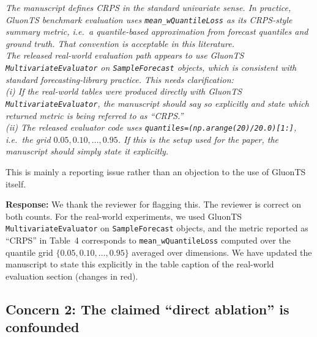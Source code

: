 \documentclass[11pt]{article}
\newcommand{\reviewertext}[1]{%
  \begin{reviewerquote}
    {\color{reviewercolor}\itshape #1}
  \end{reviewerquote}%
}
\newcommand{\authorresponse}[1]{%
  \textbf{Response:} #1\par\medskip
}
\begin{document}
\reviewertext{%
The manuscript defines CRPS in the standard univariate sense. In practice, GluonTS benchmark evaluation uses \texttt{mean\_wQuantileLoss} as its CRPS-style summary metric, i.e.\ a quantile-based approximation from forecast quantiles and ground truth. That convention is acceptable in this literature. \\
The released real-world evaluation path appears to use GluonTS \texttt{MultivariateEvaluator} on \texttt{SampleForecast} objects, which is consistent with standard forecasting-library practice.
This needs clarification:\\ (i) If the real-world tables were produced directly with GluonTS \texttt{MultivariateEvaluator}, the manuscript should say so explicitly and state which returned metric is being referred to as ``CRPS.''\\(ii) The released evaluator code uses 
\texttt{quantiles=(np.arange(20)/20.0)[1:]}, i.e.\ the grid $0.05, 0.10, \ldots, 0.95$. If this is the setup used for the paper, the manuscript should simply state it explicitly.

This is mainly a reporting issue rather than an objection to the use of GluonTS itself.
}

\authorresponse{%
We thank the reviewer for flagging this. The reviewer is correct on both counts. For the real-world experiments, we used GluonTS \texttt{MultivariateEvaluator} on \texttt{SampleForecast} objects, and the metric reported as ``CRPS'' in Table~4 corresponds to \texttt{mean\_wQuantileLoss} computed over the quantile grid $\{0.05, 0.10, \ldots, 0.95\}$ averaged over dimensions. We have updated the manuscript to state this explicitly in the table caption of the real-world evaluation section (changes in red).}

\subsection{Concern 2: The claimed ``direct ablation'' is confounded}
\end{document}
